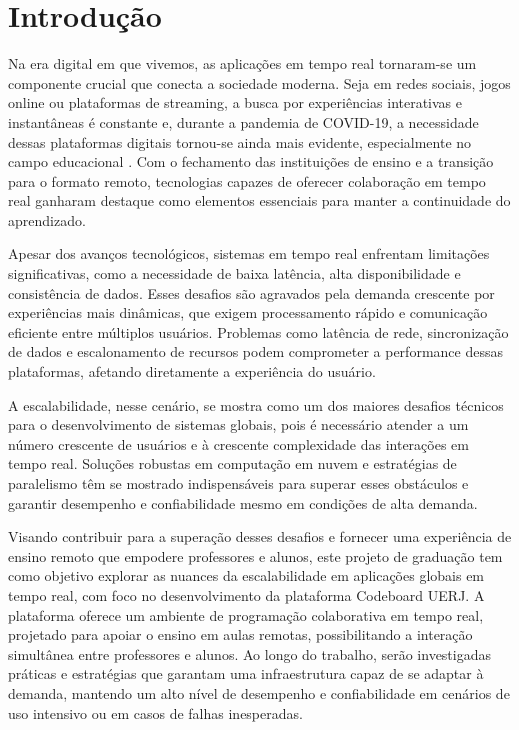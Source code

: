 \chapter*{Introdução}

Na era digital em que vivemos, as aplicações em tempo real tornaram-se um componente crucial que conecta a sociedade moderna. Seja em redes sociais, jogos online ou plataformas de streaming, a busca por experiências interativas e instantâneas é constante e, durante a pandemia de COVID-19, a necessidade dessas plataformas digitais tornou-se ainda mais evidente, especialmente no campo educacional \cite{impact-covid19-teaching-learning}. Com o fechamento das instituições de ensino e a transição para o formato remoto, tecnologias capazes de oferecer colaboração em tempo real ganharam destaque como elementos essenciais para manter a continuidade do aprendizado.

Apesar dos avanços tecnológicos, sistemas em tempo real enfrentam limitações significativas, como a necessidade de baixa latência, alta disponibilidade e consistência de dados. Esses desafios são agravados pela demanda crescente por experiências mais dinâmicas, que exigem processamento rápido e comunicação eficiente entre múltiplos usuários. Problemas como latência de rede, sincronização de dados e escalonamento de recursos podem comprometer a performance dessas plataformas, afetando diretamente a experiência do usuário.

A escalabilidade, nesse cenário, se mostra como um dos maiores desafios técnicos para o desenvolvimento de sistemas globais, pois é necessário atender a um número crescente de usuários e à crescente complexidade das interações em tempo real. Soluções robustas em computação em nuvem e estratégias de paralelismo têm se mostrado indispensáveis para superar esses obstáculos e garantir desempenho e confiabilidade mesmo em condições de alta demanda.

Visando contribuir para a superação desses desafios e fornecer uma experiência de ensino remoto que empodere professores e alunos, este projeto de graduação tem como objetivo explorar as nuances da escalabilidade em aplicações globais em tempo real, com foco no desenvolvimento da plataforma Codeboard UERJ. A plataforma oferece um ambiente de programação colaborativa em tempo real, projetado para apoiar o ensino em aulas remotas, possibilitando a interação simultânea entre professores e alunos. Ao longo do trabalho, serão investigadas práticas e estratégias que garantam uma infraestrutura capaz de se adaptar à demanda, mantendo um alto nível de desempenho e confiabilidade em cenários de uso intensivo ou em casos de falhas inesperadas.

